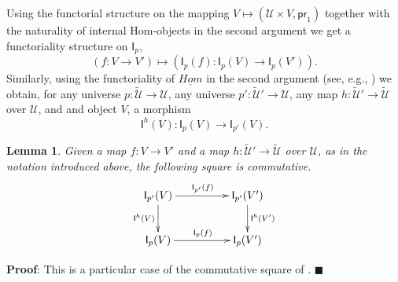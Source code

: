 \documentclass[12pt]{article}
\numberwithin{equation}{section}
\newenvironment{myproof}{{\bf Proof}:}{$\blacksquare$ \vskip 5mm }
\newtheorem{lemma}[proposition]{Lemma}
\newcommand{\sr}{\rightarrow}
\newcommand{\uu}{\underline}
\newcommand{\iHom}{\uu{Hom}}
\newcommand{\wt}{\widetilde}
\newcommand{\U}{\mathcal{U}}
\newcommand{\I}{\mathsf{I}}
\newcommand{\pr}{\mathsf{pr}}
\begin{document}
Using the functorial structure on the mapping $V\mapsto (\U\times V,\pr_1)$
together with the naturality of internal Hom-objects in the second argument we
get a functoriality structure on $\I_p$,
%
\[(f:V\sr V')\mapsto (\I_p(f):\I_p(V)\sr \I_p(V')).\]
%
Similarly, using the functoriality of $\iHom$ in the second argument (see,
e.g., \cite[\S 4.2]{presheavesOb}) we obtain, for any universe $p:\wt{\U}\sr \U$,
any universe $p':\wt{\U}'\sr \U$, any map $h:\wt{\U}'\sr \wt{\U}$ over $\U$, and and object $V$, a morphism
%
\[\I^h(V):\I_p(V)\sr \I_{p'}(V).\]
%
\begin{lemma}
  \label{2015.04.10.l2}
  Given a map $f:V\sr V'$ and a map $h:\wt{\U}'\sr \wt{\U}$ over $\U$,
  as in the notation introduced above, the following square is commutative.
%
$$
\begin{xy}
          \xymatrix@C=4pc{ \I_{p'}(V) \ar[r]^{\I_{p'}(f)} \ar[d]_{\I^h(V)} &
            \I_{p'}(V') \ar[d]^{\I^h(V')}\\ \I_p(V) \ar[r]^{\I_p(f)} & \I_p(V') }
\end{xy}
$$
\end{lemma}
%
\begin{myproof}
This is a particular case of the commutative square of \cite[Lemma 4.1.5]{presheavesOb}.
\end{myproof}
\end{document}
